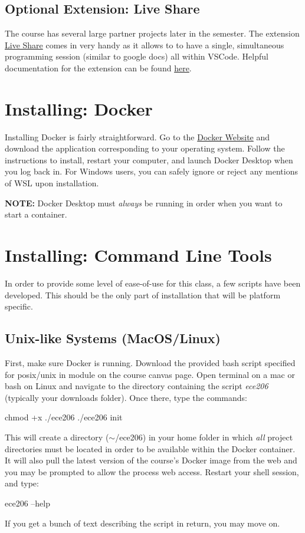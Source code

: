 \documentclass[11pt, letterpaper, titlepage, oneside]{memoir}
\begin{document}
	    \subsection*{Optional Extension: Live Share}
	        The course has several large partner projects later in the semester. The extension \href{https://marketplace.visualstudio.com/items?itemName=MS-vsliveshare.vsliveshare}{Live Share} comes in very handy as it allows to to have a single, simultaneous programming session (similar to google docs) all within VSCode. Helpful documentation for the extension can be found \href{https://docs.microsoft.com/en-us/visualstudio/liveshare/use/vscode}{here}.
	        
    \section*{Installing: Docker}
        Installing Docker is fairly straightforward. Go to the \href{https://docs.docker.com/get-docker/}{Docker Website} and download the application corresponding to your operating system. Follow the instructions to install, restart your computer, and launch Docker Desktop when you log back in. For Windows users, you can safely ignore or reject any mentions of WSL upon installation.

        \textbf{NOTE:} Docker Desktop must \textit{always} be running in order when you want to start a container.
    
    \section*{Installing: Command Line Tools}
        In order to provide some level of ease-of-use for this class, a few scripts have been developed. This should be the only part of installation that will be platform specific.

        \subsection*{Unix-like Systems (MacOS/Linux)}
            First, make sure Docker is running. Download the provided bash script specified for posix/unix in module on the course canvas page. Open terminal on a mac or bash on Linux and navigate to the directory containing the script \textit{ece206} (typically your downloads folder). Once there, type the commands:
            \begin{bash}
                chmod +x ./ece206
                ./ece206 init
            \end{bash}
            This will create a directory ($\sim$/ece206) in your home folder in which \textit{all} project directories must be located in order to be available within the Docker container. It will also pull the latest version of the course's Docker image from the web and you may be prompted to allow the process web access. Restart your shell session, and type:
            \begin{bash}
                ece206 --help
            \end{bash}
            If you get a bunch of text describing the script in return, you may move on.
\end{document}
